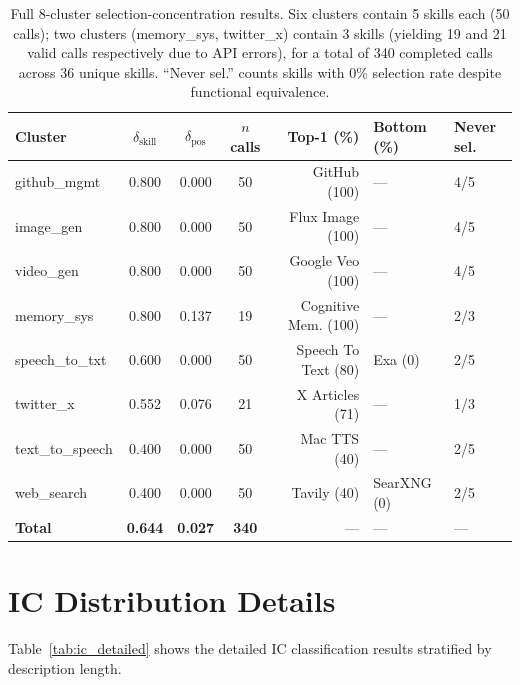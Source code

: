 \documentclass[11pt]{article}
\begin{document}
\begin{table}[t]
\centering\small
\begin{tabular}{lcccrll}
\toprule
\textbf{Cluster} & $\delta_\text{skill}$ & $\delta_\text{pos}$ &
\textbf{$n$ calls} & \textbf{Top-1 (\%)} &
\textbf{Bottom (\%)} & \textbf{Never sel.} \\
\midrule
github\_mgmt   & 0.800 & 0.000 & 50 & GitHub (100) & --- & 4/5 \\
image\_gen     & 0.800 & 0.000 & 50 & Flux Image (100) & --- & 4/5 \\
video\_gen     & 0.800 & 0.000 & 50 & Google Veo (100) & --- & 4/5 \\
memory\_sys    & 0.800 & 0.137 & 19 & Cognitive Mem. (100) & --- & 2/3 \\
speech\_to\_txt & 0.600 & 0.000 & 50 & Speech To Text (80) & Exa (0) & 2/5 \\
twitter\_x     & 0.552 & 0.076 & 21 & X Articles (71) & --- & 1/3 \\
text\_to\_speech & 0.400 & 0.000 & 50 & Mac TTS (40) & --- & 2/5 \\
web\_search    & 0.400 & 0.000 & 50 & Tavily (40) & SearXNG (0) & 2/5 \\
\midrule
\textbf{Total} & \textbf{0.644} & \textbf{0.027} & \textbf{340} & --- & --- & --- \\
\bottomrule
\end{tabular}
\caption{Full 8-cluster selection-concentration results.
Six clusters contain 5 skills each (50 calls);
two clusters (memory\_sys, twitter\_x) contain 3 skills
(yielding 19 and 21 valid calls respectively due to
API errors), for a total of 340 completed calls
across 36 unique skills.
``Never sel.'' counts skills with 0\%
selection rate despite functional equivalence.}
\label{tab:bias_full}
\end{table}

\section{IC Distribution Details}
\label{app:ic}

Table~\ref{tab:ic_detailed} shows the detailed IC classification
results stratified by description length.
\end{document}
